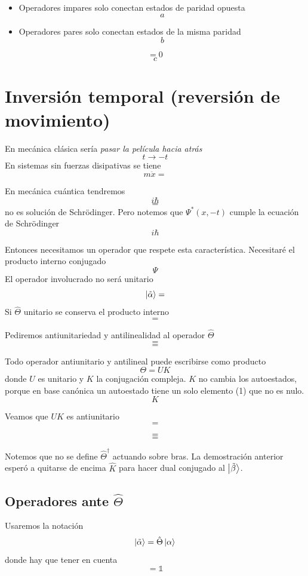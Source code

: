 \documentclass[10pt,oneside]{CBFT_book}
\begin{document}
\begin{itemize}
 \item Operadores impares solo conectan estados de paridad opuesta
 \[
	a
 \]
 \item Operadores pares solo conectan estados de la misma paridad 
 \[
	b
 \]
\end{itemize}

\[
	= 0
\]
\[
	c
\]

\section{Inversión temporal (reversión de movimiento)}

En mecánica clásica sería {\it pasar la película hacia atrás}
\[
	t \longrightarrow -t
\]
En sistemas sin fuerzas disipativas se tiene 
\[
	m \ddot{x} =
\]

En mecánica cuántica tendremos 
\[
	i \hbar 
\]
\[
	=
\]
no es solución de Schrödinger. 
Pero notemos que $\Psi^*(x,-t)$ cumple la ecuación de Schrödinger
\[
	i\hbar
\]

Entonces necesitamos un operador que respete esta característica. Necesitaré el producto interno conjugado 
\[
	\Psi
\]
El operador involucrado no será unitario 
\[
	\Ket{\tilde{\alpha}} = 
\]
Si $\hat{\Theta}$ unitario se conserva el producto interno 
\[
	=
\]

Pediremos antiunitariedad y antilinealidad al operador $\hat{\Theta}$
\[
	=
\]
\[
	=
\]

Todo operador antiunitario y antilineal puede escribirse como producto 
\[
	\Theta = U K
\]
donde $U$ es unitario y $K$ la conjugación compleja. $K$ no cambia los autoestados, porque en base canónica 
un autoestado tiene un solo elemento (1) que no es nulo.
\[
	K
\]

Veamos que $UK$ es antiunitario 
\[
	=
\]

\[
	=
\]
\[
	=
\]

Notemos que no se define $\hat{\Theta}^\dagger$ actuando sobre bras. La demostración anterior esperó a 
quitarse de encima $\hat{K}$ para hacer dual conjugado al $\Ket{\tilde{\beta}}$.

\subsection{Operadores ante $\hat{\Theta}$}

Usaremos la notación 
\[
	\Ket{\tilde{\alpha}} = \hat{\Theta} \Ket{\alpha}
\]
donde hay que tener en cuenta 
\[
	= \mathbb{1}
\]
\end{document}

